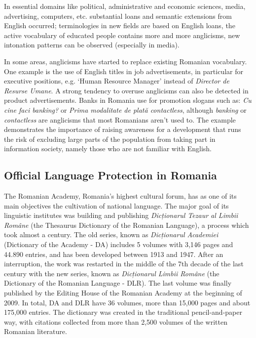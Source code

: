 \documentclass[]{../../metanetpaper}
\begin{document}
\begin{multicols}{2}
In essential domains like political, administrative and economic sciences, media, advertising, computers, etc. substantial loans and semantic extensions from English occurred; terminologies in new fields are based on English loans, the active vocabulary of educated people contains more and more anglicisms, new intonation patterns can be observed (especially in media).

In some areas, anglicisms have started to replace existing Romanian vocabulary. One example is the use of English titles in job advertisements, in particular for executive positions, e.g. ‘Human Resource Manager’ instead of \textit{Director de Resurse Umane}. A strong tendency to overuse anglicisms can also be detected in product advertisements. Banks in Romania use for promotion slogans such as: \textit{Cu cine faci banking?} or \textit{Prima modalitate de plată contactless}, although \textit{banking} or \textit{contactless} are anglicisms that most Romanians aren’t used to. 
The example demonstrates the importance of raising awareness for a development that runs the risk of excluding large parts of the population from taking part in information society, namely those who are not familiar with English.

\subsection{Official Language Protection in Romania}

The Romanian Academy, Romania’s highest cultural forum, has as one of its main objectives the cultivation of national language. The major goal of its linguistic institutes was building and publishing \textit{Dicționarul Tezaur al Limbii Române} (the Thesaurus Dictionary of the Romanian Language), a process which took almost a century. The old series, known as \textit{Dicționarul Academiei} (Dictionary of the Academy - DA) includes 5 volumes with 3,146 pages and 44.890 entries, and has been developed between 1913 and 1947. After an interruption, the work was restarted in the middle of the 7th decade of the last century with the new series, known as \textit{Dicționarul Limbii Române} (the Dictionary of the Romanian Language - DLR). The last volume was finally published by the Editing House of the Romanian Academy at the beginning of 2009. In total, DA and DLR have 36 volumes, more than 15,000 pages and about 175,000 entries. The dictionary was created in the traditional pencil-and-paper way, with citations collected from more than 2,500 volumes of the written Romanian literature.


\end{multicols}
\end{document}
